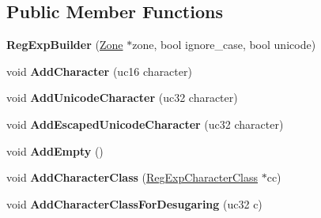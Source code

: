 \subsection*{Public Member Functions}
\begin{DoxyCompactItemize}
\item 
{\bfseries Reg\+Exp\+Builder} (\hyperlink{classv8_1_1internal_1_1_zone}{Zone} $\ast$zone, bool ignore\+\_\+case, bool unicode)\hypertarget{classv8_1_1internal_1_1_reg_exp_builder_a8721fb2629410b9c6664941b36285efa}{}\label{classv8_1_1internal_1_1_reg_exp_builder_a8721fb2629410b9c6664941b36285efa}

\item 
void {\bfseries Add\+Character} (uc16 character)\hypertarget{classv8_1_1internal_1_1_reg_exp_builder_a32147135c6698790960b719446a1fe28}{}\label{classv8_1_1internal_1_1_reg_exp_builder_a32147135c6698790960b719446a1fe28}

\item 
void {\bfseries Add\+Unicode\+Character} (uc32 character)\hypertarget{classv8_1_1internal_1_1_reg_exp_builder_a8491eb3bdec11ed728ed6f75d111c161}{}\label{classv8_1_1internal_1_1_reg_exp_builder_a8491eb3bdec11ed728ed6f75d111c161}

\item 
void {\bfseries Add\+Escaped\+Unicode\+Character} (uc32 character)\hypertarget{classv8_1_1internal_1_1_reg_exp_builder_aa3ab437321a59b2b20165331aa19ac0b}{}\label{classv8_1_1internal_1_1_reg_exp_builder_aa3ab437321a59b2b20165331aa19ac0b}

\item 
void {\bfseries Add\+Empty} ()\hypertarget{classv8_1_1internal_1_1_reg_exp_builder_aa1d8f7f7665968635496315908e83400}{}\label{classv8_1_1internal_1_1_reg_exp_builder_aa1d8f7f7665968635496315908e83400}

\item 
void {\bfseries Add\+Character\+Class} (\hyperlink{classv8_1_1internal_1_1_reg_exp_character_class}{Reg\+Exp\+Character\+Class} $\ast$cc)\hypertarget{classv8_1_1internal_1_1_reg_exp_builder_a56716958758a46118b99c0afd32307a4}{}\label{classv8_1_1internal_1_1_reg_exp_builder_a56716958758a46118b99c0afd32307a4}

\item 
void {\bfseries Add\+Character\+Class\+For\+Desugaring} (uc32 c)\hypertarget{classv8_1_1internal_1_1_reg_exp_builder_a6b1b6671b0ee0266e618cf980f633855}{}\label{classv8_1_1internal_1_1_reg_exp_builder_a6b1b6671b0ee0266e618cf980f633855}


\end{DoxyCompactItemize}
